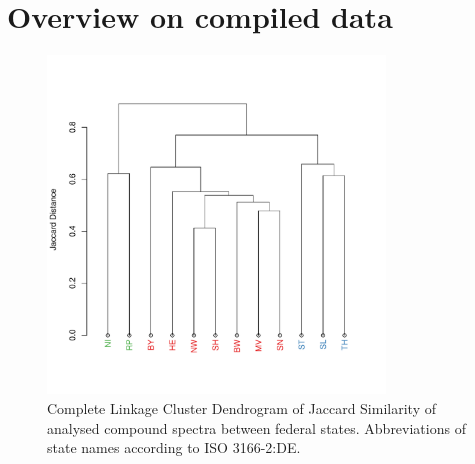 \documentclass[pdftex,a4paper]{scrreprt}
\begin{document}
\chapter{Overview on compiled data}


\begin{figure}[h]
	\centering
	\includegraphics[width = 0.8\textwidth]{varclus}
	\caption{Complete Linkage Cluster Dendrogram of Jaccard Similarity of analysed compound spectra between federal states. Abbreviations of state names according to ISO 3166-2:DE.}
	\label{fig:varclus}
\end{figure}


\end{document}
